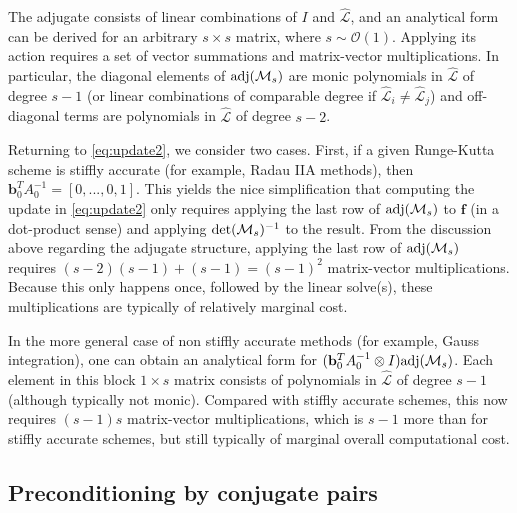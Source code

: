 \documentclass[review]{siamart}
\begin{document}
\begin{remark}
The adjugate consists of linear combinations of $I$ and $\widehat{\mathcal{L}}$, and an
analytical form can be derived for an arbitrary $s\times s$ matrix, where
$s\sim\mathcal{O}(1)$.
Applying its action requires a set of vector summations
and matrix-vector multiplications. In particular, the diagonal elements of
$\textnormal{adj}(\mathcal{M}_s)$ are monic polynomials in $\widehat{\mathcal{L}}$ of
degree $s-1$ (or linear combinations of comparable degree if
$\widehat{\mathcal{L}}_i\neq\widehat{\mathcal{L}}_j$)
and off-diagonal terms are polynomials in $\widehat{\mathcal{L}}$ of degree $s-2$.

Returning to \eqref{eq:update2}, we consider two cases. First, if a given Runge-Kutta
scheme is stiffly accurate (for example, Radau IIA methods),
then $\mathbf{b}_0^TA_0^{-1} = [0,...,0,1]$. This yields
the nice simplification that computing the update in \eqref{eq:update2} only requires
applying the last row of $\textnormal{adj}(\mathcal{M}_s)$ to $\mathbf{f}$ (in a
dot-product sense) and applying $\textnormal{det}(\mathcal{M}_s)^{-1}$ to the result. From
the discussion above regarding the adjugate structure, applying the last row of
$\textnormal{adj}(\mathcal{M}_s)$ requires $(s-2)(s-1) + (s-1) = (s-1)^2$ matrix-vector
multiplications. Because this only happens once, followed by the linear solve(s),
these multiplications are typically of relatively marginal cost.

In the more general case of non stiffly accurate methods (for example, Gauss integration),
one can obtain an analytical form for
$(\mathbf{b}_0^TA_0^{-1}\otimes I)\textnormal{adj}(\mathcal{M}_s)$. Each element in
this block $1\times s$ matrix consists of polynomials in $\widehat{\mathcal{L}}$ of
degree $s-1$ (although
typically not monic). Compared with stiffly accurate schemes, this now requires
$(s-1)s$ matrix-vector multiplications, which is $s-1$ more than for stiffly
accurate schemes, but still typically of marginal overall computational cost.
\end{remark}

\subsection{Preconditioning by conjugate pairs}\label{sec:solve:prec}
\end{document}
